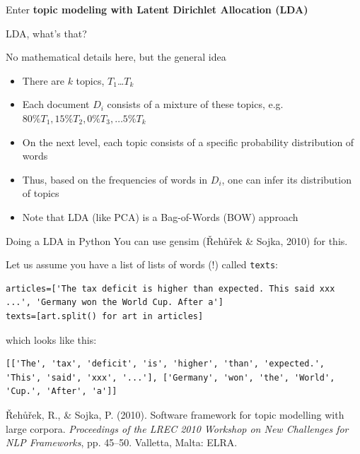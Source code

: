 \documentclass{beamer}
\begin{document}
\begin{frame}{}
Enter \textbf{topic modeling with Latent Dirichlet Allocation (LDA)}
\end{frame}



\begin{frame}{LDA, what's that?}
\begin{block}{No mathematical details here, but the general idea}
\begin{itemize}
\item There are $k$ topics, $T_1$\ldots$T_k$
\item Each document $D_i$ consists of a mixture of these topics, e.g.$80\% T_1, 15\% T_2, 0\% T_3, \ldots 5\% T_k $
\item On the next level, each topic consists of a specific probability distribution of words
\item Thus, based on the frequencies of words in $D_i$, one can infer its distribution of topics
\item Note that LDA (like PCA) is a Bag-of-Words (BOW) approach
\end{itemize}
\end{block}

\end{frame}




\begin{frame}[fragile]{Doing a LDA in Python}
You can use gensim ({\v R}eh{\r u}{\v r}ek \& Sojka, 2010) for this.

Let us assume you have a list of lists of words (!) called \texttt{texts}:

\begin{lstlisting}
articles=['The tax deficit is higher than expected. This said xxx ...', 'Germany won the World Cup. After a']
texts=[art.split() for art in articles]
\end{lstlisting}
which looks like this:
\begin{lstlisting}
[['The', 'tax', 'deficit', 'is', 'higher', 'than', 'expected.', 'This', 'said', 'xxx', '...'], ['Germany', 'won', 'the', 'World', 'Cup.', 'After', 'a']]
\end{lstlisting}

\tiny{{\v R}eh{\r u}{\v r}ek, R., \& Sojka, P. (2010). Software framework for topic modelling with large corpora. \emph{Proceedings of the LREC 2010 Workshop on New Challenges for NLP Frameworks}, pp. 45–50. Valletta, Malta: ELRA. }

\end{frame}
\end{document}
